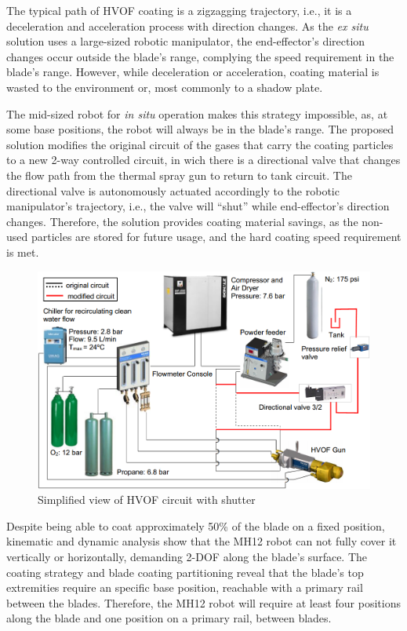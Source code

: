 The typical path of HVOF coating is a zigzagging trajectory,
i.e., it is a deceleration and acceleration process with direction changes. As
the \textit{ex situ} solution uses a large-sized robotic manipulator, the
end-effector's direction changes occur outside the blade's range, complying the
speed requirement in the blade's range. However, while deceleration or
acceleration, coating material is wasted to the environment or, most commonly
to a shadow plate.

The mid-sized robot for \textit{in situ} operation makes this strategy
impossible, as, at some base positions, the robot will always be in the blade's
range. The proposed solution modifies the original circuit of the gases that
carry the coating particles to a new 2-way controlled circuit, in wich there is a directional
valve that changes the flow path from the thermal spray gun to return to tank
circuit. %
The directional valve is autonomously actuated accordingly to the robotic
manipulator's trajectory, i.e., the valve will ``shut'' while end-effector's
direction changes. Therefore, the solution provides coating material savings,
as the non-used particles are stored for future usage, and the hard coating
speed requirement is met.

\begin{figure}[h!]
   \centering
   \includegraphics[width=0.9\columnwidth]{figs/mecanica/Circuito_HVOF_mod_en.png}
   \caption{Simplified view of HVOF circuit with shutter}
   \label{fig::circuito_hvof}
\end{figure}

Despite being able to coat approximately 50\% of the blade on a fixed
position, kinematic and dynamic analysis show that the MH12 robot can not fully
cover it vertically or horizontally, demanding 2-DOF along the blade's surface.
The coating strategy and blade coating partitioning reveal that the blade's top
extremities require an specific base position, reachable
with a primary rail between the blades. Therefore, the MH12 robot will require
at least four positions along the blade and one position on a primary
rail, between blades. 

